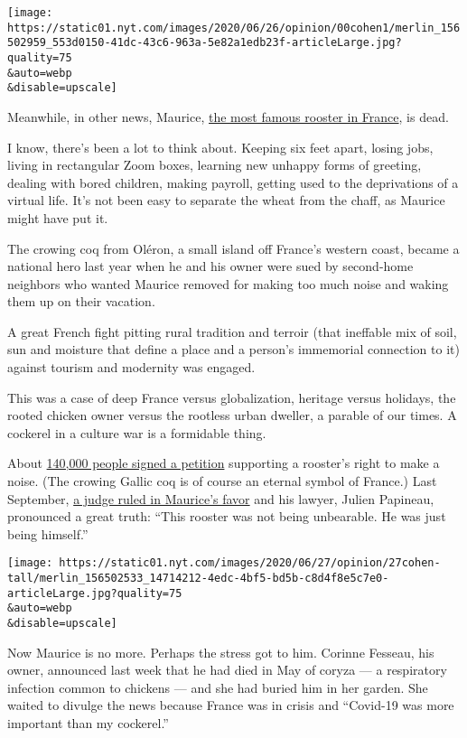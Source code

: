 \texttt{[image: https://static01.nyt.com/images/2020/06/26/opinion/00cohen1/merlin\_156502959\_553d0150-41dc-43c6-963a-5e82a1edb23f-articleLarge.jpg?quality=75\\\&auto=webp\\\&disable=upscale]}

Meanwhile, in other news, Maurice,
\href{https://www.nytimes.com/2019/06/23/world/europe/france-rural-urban-rooster.html}{the
most famous rooster in France}, is dead.

I know, there's been a lot to think about. Keeping six feet apart,
losing jobs, living in rectangular Zoom boxes, learning new unhappy
forms of greeting, dealing with bored children, making payroll, getting
used to the deprivations of a virtual life. It's not been easy to
separate the wheat from the chaff, as Maurice might have put it.

The crowing coq from Oléron, a small island off France's western coast,
became a national hero last year when he and his owner were sued by
second-home neighbors who wanted Maurice removed for making too much
noise and waking them up on their vacation.

A great French fight pitting rural tradition and terroir (that ineffable
mix of soil, sun and moisture that define a place and a person's
immemorial connection to it) against tourism and modernity was engaged.

This was a case of deep France versus globalization, heritage versus
holidays, the rooted chicken owner versus the rootless urban dweller, a
parable of our times. A cockerel in a culture war is a formidable thing.

About
\href{https://www.thelocal.fr/20190905/maurice-the-cockerel-to-learn-his-fate-in-row-over-noise-in-rural-france}{140,000
people signed a petition} supporting a rooster's right to make a noise.
(The crowing Gallic coq is of course an eternal symbol of France.) Last
September,
\href{https://www.nytimes.com/2019/09/05/world/europe/france-maurice-rooster.html}{a
judge ruled in Maurice's favor} and his lawyer, Julien Papineau,
pronounced a great truth: ``This rooster was not being unbearable. He
was just being himself.''

\texttt{[image: https://static01.nyt.com/images/2020/06/27/opinion/27cohen-tall/merlin\_156502533\_14714212-4edc-4bf5-bd5b-c8d4f8e5c7e0-articleLarge.jpg?quality=75\\\&auto=webp\\\&disable=upscale]}

Now Maurice is no more. Perhaps the stress got to him. Corinne Fesseau,
his owner, announced last week that he had died in May of coryza --- a
respiratory infection common to chickens --- and she had buried him in
her garden. She waited to divulge the news because France was in crisis
and ``Covid-19 was more important than my cockerel.''

